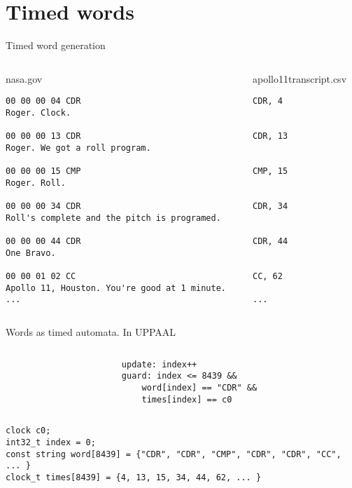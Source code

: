 \section{Timed words}
\begin{frame}[fragile]{Timed word generation}
    \begin{columns}
        \begin{column}{0.6\textwidth}
            nasa.gov
            \begin{lstlisting}[basicstyle=\tiny]
00 00 00 04 CDR
Roger. Clock.

00 00 00 13 CDR
Roger. We got a roll program.

00 00 00 15 CMP
Roger. Roll.

00 00 00 34 CDR
Roll's complete and the pitch is programed.

00 00 00 44 CDR
One Bravo.

00 00 01 02 CC
Apollo 11, Houston. You're good at 1 minute.
...
            \end{lstlisting}
        \end{column}
        \begin{column}{0.4\textwidth}
            apollo11transcript.csv
            \begin{lstlisting}[basicstyle=\tiny]
CDR, 4


CDR, 13


CMP, 15


CDR, 34


CDR, 44


CC, 62

...
            \end{lstlisting}
        \end{column}
    \end{columns}
\end{frame}

\begin{frame}[fragile]{Words as timed automata.}
    In UPPAAL
    \begin{columns}
        \begin{column}{0.5\textwidth}
            

        \end{column}
        \begin{column}{0.5\textwidth}
            \begin{lstlisting}[basicstyle=\tiny]
update: index++
guard: index <= 8439 &&
    word[index] == "CDR" &&
    times[index] == c0
            \end{lstlisting}
        \end{column}
    \end{columns}
    \begin{lstlisting}[basicstyle=\tiny]
clock c0;
int32_t index = 0;
const string word[8439] = {"CDR", "CDR", "CMP", "CDR", "CDR", "CC", ... }
clock_t times[8439] = {4, 13, 15, 34, 44, 62, ... }
    \end{lstlisting}
\end{frame}


